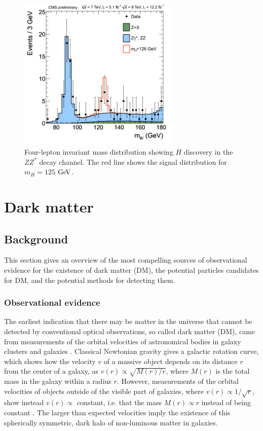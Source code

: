 \begin{figure}[tbh]
\centering
\includegraphics[width=3in]{figures/ZZMass_7Plus8TeV_70-180_3GeV.png}
\caption{Four-lepton invariant mass distribution showing $H$ discovery in the $ZZ^*$ decay channel. The red line shows the signal distribution for $m_H=125$ $\mathrm{Ge\kern -0.1em V}$.}
\label{4l}
\end{figure}


\section{Dark matter}

\subsection{Background}

This section gives an overview of the most compelling sources of observational evidence for the existence of dark matter (DM), the potential particles candidates for DM, and the potential methods for detecting them.  

\subsubsection{Observational evidence}

The earliest indication that there may be matter in the universe that cannot be detected by conventional optical observations, so called dark matter (DM), came from measurements of the orbital velocities of astronomical bodies in galaxy clusters \cite{Kapteyn:1922zz, Zwicky:1937zza} and galaxies \cite{Rubin:1970zza, Rubin:1980zd}. Classical Newtonian gravity gives a galactic rotation curve, which shows how the velocity $v$ of a massive object depends on its distance $r$ from the center of a galaxy, as $v(r) \propto \sqrt{M(r)/r}$, where $M(r)$ is the total mass in the galaxy within a radius $r$. However, measurements of the orbital velocities of objects outside of the visible part of galaxies, where $v(r) \propto 1/\sqrt{r}$, show instead $v(r) \propto$ constant, i.e. that the mass $M(r) \propto r$ instead of being constant \cite{Agashe:2014kda}. The larger than expected velocities imply the existence of this spherically symmetric, dark halo of non-luminous matter in galaxies. 

